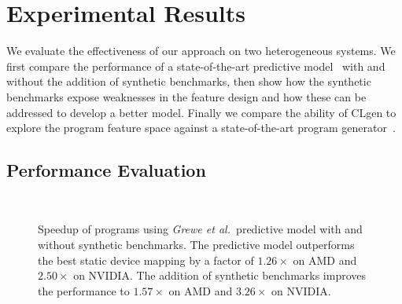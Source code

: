 \section{Experimental Results}%
\label{sec:clgen-eval-results}

We evaluate the effectiveness of our approach on two heterogeneous systems. We first compare the performance of a state-of-the-art predictive model~\cite{Grewe2013} with and without the addition of synthetic benchmarks, then show how the synthetic benchmarks expose weaknesses in the feature design and how these can be addressed to develop a better model. Finally we compare the ability of CLgen to explore the program feature space against a state-of-the-art program generator~\cite{Lidbury2015a}.

\subsection{Performance Evaluation}%
\label{subsec:eval-cgo13}

\begin{figure}
  \centering %
  \\%
  \caption[Speedup of programs with and without synthetic benchmarks]{%
    Speedup of programs using \emph{Grewe et al.\ }predictive model with and without synthetic benchmarks. The predictive model outperforms the best static device mapping by a factor of $1.26\times$ on AMD and $2.50\times$ on NVIDIA. The addition of synthetic benchmarks improves the performance to $1.57\times$ on AMD and $3.26\times$ on NVIDIA.%
  }%
  \label{fig:npb} %
\end{figure}

